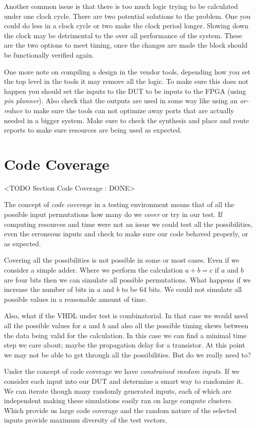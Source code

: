 Another common issue is that there is too much logic trying to be calculated under one clock cycle. There are two potential solutions to the problem. One you could do less in a clock cycle or two make the clock period longer. Slowing down the clock may be detrimental to the over all performance of the system. These are the two options to meet timing, once the changes are made the block should be functionally verified again.  

One more note on compiling a design in the vendor tools, depending how you set the top level in the tools it may remove all the logic. To make sure this does not happen you should set the inputs to the \ac{DUT} to be inputs to the FPGA (using \emph{pin planner}). Also check that the outputs are used in some way like using an \emph{or-reduce} to make sure the tools can not optimize away ports that are actually needed in a bigger system. Make sure to check the synthesis and place and route reports to make sure resources are being used as expected. 
		
\section{Code Coverage}
	<TODO Section Code Coverage : DONE>
	
The concept of \emph{code coverage} in a testing environment means that of all the possible input permutations how many do we \emph{cover} or try in our test. If computing resources and time were not an issue we could test all the possibilities, even the erroneous inputs and check to make sure our code behaved properly, or as expected. 

Covering all the possibilities is not possible in some or most cases. Even if we consider a simple adder. Where we perform the calculation $a+b=c$ if $a$ and $b$ are four bits then we can simulate all possible permutations. What happens if we increase the number of bits in $a$ and $b$ to be $64$ bits. We could not simulate all possible values in a reasonable amount of time.

Also, what if the \ac{VHDL} under test is combinatorial. In that case we would need all the possible values for $a$ and $b$ and also all the possible timing skews between the data being valid for the calculation. In this case we can find a minimal time step we care about; maybe the propagation delay for a transistor. At this point we may not be able to get through all the possibilities. But do we really need to?

Under the concept of code coverage we have \emph{constrained random inputs}. If we consider each input into our \ac{DUT} and determine a smart way to randomize it. We can iterate though many randomly generated inputs, each of which are independent making these simulations easily ran on large compute clusters. Which provide us large code coverage and the random nature of the selected inputs provide maximum diversity of the test vectors.  

